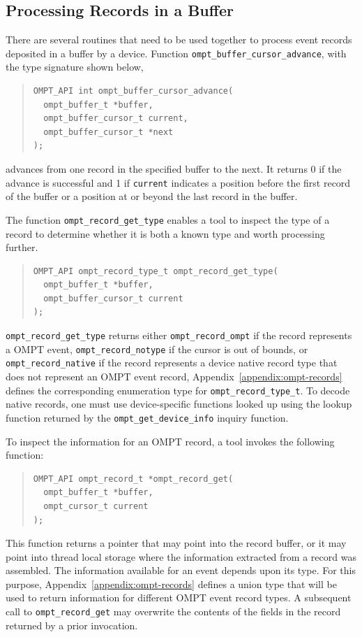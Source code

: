 \documentclass{article}
\begin{document}
\subsection{Processing Records in a Buffer}
\label{sec:record-data}

There are several routines that need to be used together to process %
event records deposited in a buffer by a device. Function \verb|ompt_buffer_cursor_advance|, with the type signature shown below,

\begin{quote}
\begin{verbatim}
OMPT_API int ompt_buffer_cursor_advance(
  ompt_buffer_t *buffer, 
  ompt_buffer_cursor_t current, 
  ompt_buffer_cursor_t *next
); 
\end{verbatim}
\end{quote}
advances from one record in the specified buffer to the next. It returns 0 if the advance is successful and 1 if \verb|current| indicates a position before the first record of the buffer or a position at or beyond the last record in the buffer.

The function \verb|ompt_record_get_type| enables a tool to inspect the type of a record to determine whether it is both a known type and worth processing further. 
\begin{quote}
\begin{verbatim}
OMPT_API ompt_record_type_t ompt_record_get_type(
  ompt_buffer_t *buffer, 
  ompt_buffer_cursor_t current
);
\end{verbatim}
\end{quote}
\verb|ompt_record_get_type| returns either \verb|ompt_record_ompt| if the record represents a OMPT event, \verb|ompt_record_notype| if the cursor is out of bounds, or  \verb|ompt_record_native| if the record represents a device native record type that does not represent an OMPT event record, Appendix~\ref{appendix:ompt-records} defines the corresponding enumeration type for \verb|ompt_record_type_t|.
To decode native records, one must use device-specific functions looked up using the lookup function returned by the \verb|ompt_get_device_info| inquiry function. 

To inspect the information for an OMPT record, a tool invokes the following function:
\begin{quote}
\begin{verbatim}
OMPT_API ompt_record_t *ompt_record_get(
  ompt_buffer_t *buffer, 
  ompt_cursor_t current
);
\end{verbatim}
\end{quote}
This function returns a pointer that may point into the record buffer, or it may point into thread local storage where the information extracted from a record was assembled. The information available for an event depends upon its type. For this purpose, Appendix~\ref{appendix:ompt-records} defines a union type that will be used to return information for different OMPT event record types. A subsequent call to \verb|ompt_record_get| may overwrite the contents of the fields in the record returned by a prior invocation.
\end{document}
